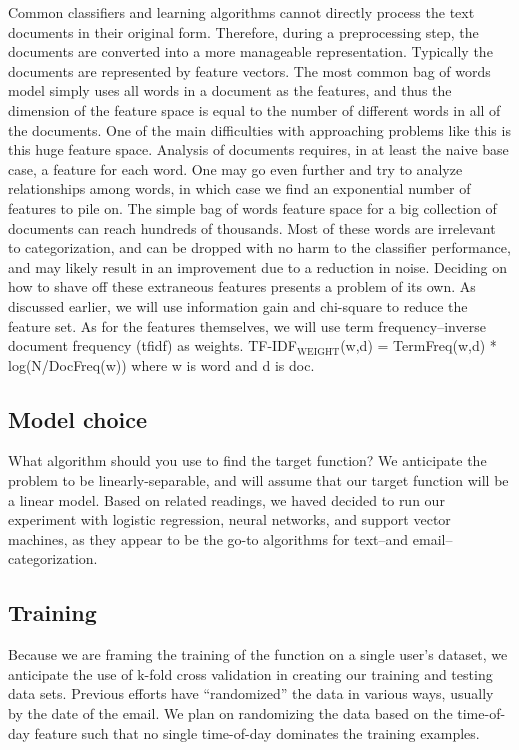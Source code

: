\documentclass[11pt]{article}
\begin{document}
Common classifiers and learning algorithms cannot directly process the text documents in their original form. Therefore, during a preprocessing step, the documents are converted into a more manageable representation. Typically the documents are represented by feature vectors. The most common bag of words model simply uses all words in a document as the features, and thus the dimension of the feature space is equal to the number of different words in all of the documents.
One of the main difficulties with approaching problems like this is this huge feature space. Analysis of documents requires, in at least the naive base case, a feature for each word. One may go even further and try to analyze relationships among words, in which case we find an exponential number of features to pile on. The simple bag of words feature space for a big collection of documents can reach hundreds of thousands. Most of these words are irrelevant to categorization, and can be dropped with no harm to the classifier performance, and may likely result in an improvement due to a reduction in noise. Deciding on how to shave off these extraneous features presents a problem of its own. As discussed earlier, we will use information gain and chi-square to reduce the feature set.
As for the features themselves, we will use term frequency–inverse document frequency (tfidf) as weights. TF-IDF$_{\mathrm{WEIGHT}}$(w,d) = TermFreq(w,d) * log(N/DocFreq(w)) where w is word and d is doc. 
\subsection{Model choice}
\label{sec-4-2}


What algorithm should you use to find the target function?
We anticipate the problem to be linearly-separable, and will assume that our target function will be a linear model. Based on related readings, we haved decided to run our experiment with logistic regression, neural networks, and support vector machines, as they appear to be the go-to algorithms for text--and email--categorization.
\subsection{Training}
\label{sec-4-3}


Because we are framing the training of the function on a single user’s dataset, we anticipate the use of k-fold cross validation in creating our training and testing data sets. Previous efforts have “randomized” the data in various ways, usually by the date of the email. We plan on randomizing the data based on the time-of-day feature such that no single time-of-day dominates the training examples.
\end{document}
